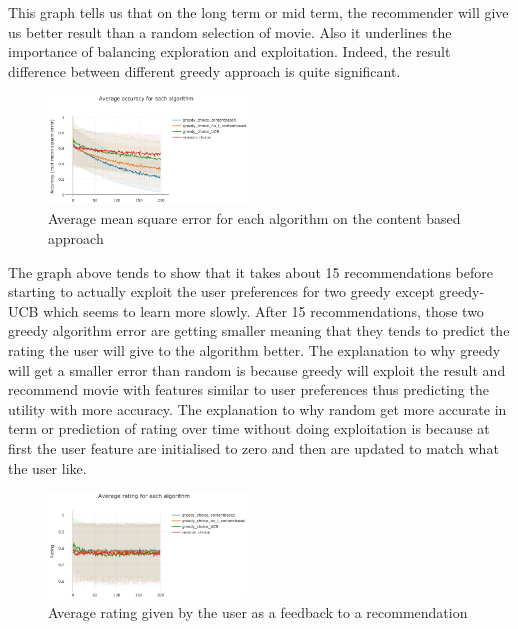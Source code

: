 \documentclass[letterpaper]{article}
\begin{document}
This graph tells us that on the long term or mid term, the recommender will give us better result than a random selection of movie. Also it underlines the importance of balancing exploration and exploitation. Indeed, the result difference between different greedy approach is quite significant.

\begin{figure}[H]
\begin{center}
\includegraphics[width=0.47\textwidth]{img/greedy1.png}
\caption{Average mean square error for each algorithm on the content based approach}
\label{greedy1}
\end{center}
\end{figure}

The graph above tends to show that it takes about 15 recommendations before starting to actually exploit the user preferences for two greedy except greedy-UCB which seems to learn more slowly. After 15 recommendations, those two greedy algorithm error are getting smaller meaning that they tends to predict the rating the user will give to the algorithm better.
The explanation to why greedy will get a smaller error than random is because greedy will exploit the result and recommend movie with features similar to user preferences thus predicting the utility with more accuracy.
The explanation to why random get more accurate in term or prediction of rating over time without doing exploitation is because at first the user feature are initialised to zero and then are updated to match what the user like.

\begin{figure}[H]
\begin{center}
\includegraphics[width=0.47\textwidth]{img/greedy2.png}
\caption{Average rating given by the user as a feedback to a recommendation}
\label{schema2}
\end{center}
\end{figure}
\end{document}

